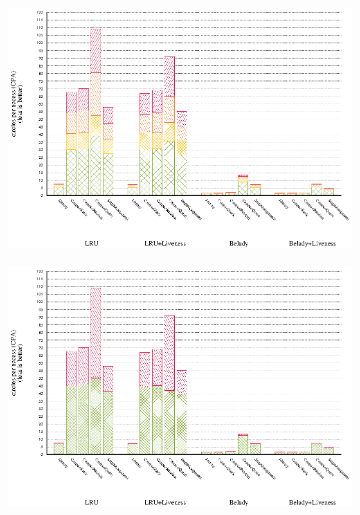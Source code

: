 \documentclass[onecolumn, openright, master, english, signatures]{dbrgrptt}
\begin{document}
\begin{figure}[!ht]
  \begin{subfigure}[b]{0.5\textwidth}%
    \includegraphics[width=\textwidth]{figs/plots/perf-483-xalancbmk.eps}
  \end{subfigure}%
  \begin{subfigure}[b]{0.5\textwidth}%
    \includegraphics[width=\textwidth]{figs/plots/perf-misses-483-xalancbmk.eps}
  \end{subfigure}%
  \caption{}
  \label{fig:todo}
\end{figure}
\end{document}
